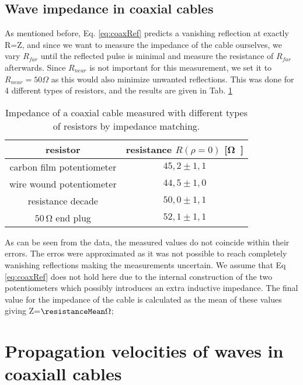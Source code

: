 \documentclass[a4paper,10pt,twocolumn]{article}
\begin{document}
    \subsection{Wave impedance in coaxial cables}
    As mentioned before, Eq. \ref{eq:coaxRef} predicts a vanishing reflection at exactly R=Z, and since we want to measure the impedance of the cable ourselves, we vary $R_{far}$ until the reflected pulse is minimal and measure the resistance of $R_{far}$ afterwards.
    Since $R_{near}$ is not important for this measurement, we set it to $R_{near}=50\Omega $ as this would also minimize unwanted reflections.
    This was done for 4 different types of resistors, and the results are given in Tab. \ref{tab:impedance}
    \begin{table}[htbp]          %
        \centering
        \begin{tabular*}{\linewidth}{@{\extracolsep{\fill}}cc}
            \hline
            \hline
            \rule[-7pt]{0pt}{23pt}  resistor  &  resistance $R(\rho=0)$ [\si\ohm]  	 \\
            \hline
            \rule[-5pt]{0pt}{23pt}   carbon film potentiometer   &   $45,2 \pm 1,1$  	 \\
            \rule[-5pt]{0pt}{23pt}   wire wound potentiometer   &   $44,5 \pm 1,0$  	 \\
            \rule[-5pt]{0pt}{23pt}   resistance decade   &   $50,0 \pm 1,1$  	 \\
            \rule[-5pt]{0pt}{23pt}   $50\,\si\ohm$ end plug   &   $52,1 \pm 1,1$  	 \\
            \hline
            \hline
        \end{tabular*}
        \normalsize
        \caption[]{Impedance of a coaxial cable measured with different types of resistors by impedance matching.}  %
        \label{tab:impedance}                             %
    \end{table}
    As can be seen from the data, the measured values do not coincide within their errors. The erros were approximated as it was not possible to reach completely wanishing reflections making the measurements uncertain.
    We assume that Eq \ref{eq:coaxRef} does not hold here due to the internal construction of the two potentiometers which possibly introduces an extra inductive impedance.
    The final value for the impedance of the cable is calculated as the mean of these values giving Z=$\resistanceMean \Omega$;
    \section{Propagation velocities of waves in coaxiall cables}
\end{document}
